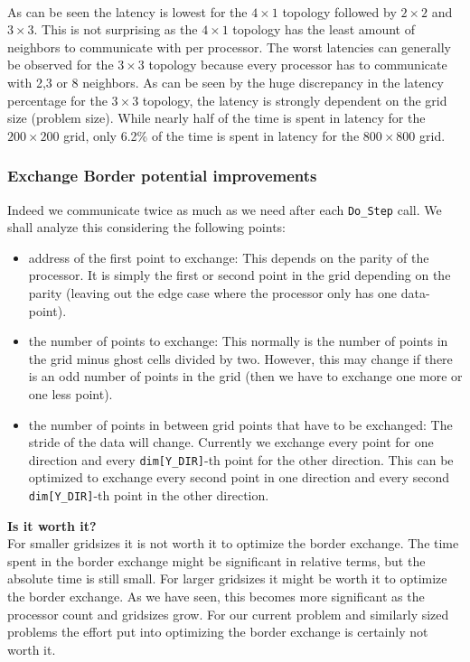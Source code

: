 \\
As can be seen the latency is lowest for the $4\times1$ topology followed by $2\times2$ and $3\times3$. This is not surprising as the $4\times1$ topology has the least amount of neighbors to communicate with per processor. The worst latencies can generally be observed for the $3\times3$ topology because every processor has to communicate with 2,3 or 8 neighbors. As can be seen by the huge discrepancy in the latency percentage for the $3\times3$ topology, the latency is strongly dependent on the grid size (problem size). While nearly half of the time is spent in latency for the $200 \times 200$ grid, only 6.2\% of the time is spent in latency for the $800 \times 800$ grid.\\

\subsubsection{Exchange Border potential improvements}
Indeed we communicate twice as much as we need after each \texttt{Do\_Step} call. We shall analyze this considering the following points: 
\begin{itemize}
    \item address of the first point to exchange: This depends on the parity of the processor. It is simply the first or second point in the grid depending on the parity (leaving out the edge case where the processor only has one data-point).
    \item the number of points to exchange: This normally is the number of points in the grid minus ghost cells divided by two. However, this may change if there is an odd number of points in the grid (then we have to exchange one more or one less point).
    \item the number of points in between grid points that have to be exchanged: The stride of the data will change. Currently we exchange every point for one direction and every \texttt{dim[Y\_DIR]}-th point for the other direction. This can be optimized to exchange every second point in one direction and every second \texttt{dim[Y\_DIR]}-th point in the other direction. 
\end{itemize}

\textbf{Is it worth it?}\\
For smaller gridsizes it is not worth it to optimize the border exchange. The time spent in the border exchange might be significant in relative terms, but the absolute time is still small. For larger gridsizes it might be worth it to optimize the border exchange. As we have seen, this becomes more significant as the processor count and gridsizes grow. For our current problem and similarly sized problems the effort put into optimizing the border exchange is certainly not worth it.